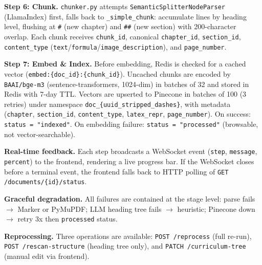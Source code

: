 \documentclass[12pt,a4paper]{article}
\begin{document}
\bigskip

\textbf{Step 6: Chunk.} \texttt{chunker.py} attempts \texttt{SemanticSplitterNodeParser} (LlamaIndex) first, falls back to \texttt{\_simple\_chunk}: accumulate lines by heading level, flushing at \texttt{\#} (new chapter) and \texttt{\#\#} (new section) with 200-character overlap. Each chunk receives \texttt{chunk\_id}, canonical \texttt{chapter\_id}, \texttt{section\_id}, \texttt{content\_type} (\texttt{text}/\texttt{formula}/\texttt{image\_description}), and \texttt{page\_number}.

\bigskip

\textbf{Step 7: Embed \& Index.} Before embedding, Redis is checked for a cached vector (\texttt{embed:\{doc\_id\}:\{chunk\_id\}}). Uncached chunks are encoded by \texttt{BAAI/bge-m3} (sentence-transformers, 1024-dim) in batches of 32 and stored in Redis with 7-day TTL. Vectors are upserted to Pinecone in batches of 100 (3 retries) under namespace \texttt{doc\_\{uuid\_stripped\_dashes\}}, with metadata (\texttt{chapter}, \texttt{section\_id}, \texttt{content\_type}, \texttt{latex\_repr}, \texttt{page\_number}). On success: \texttt{status = "indexed"}. On embedding failure: \texttt{status = "processed"} (browsable, not vector-searchable).

\bigskip

\textbf{Real-time feedback.} Each step broadcasts a WebSocket event (\texttt{step}, \texttt{message}, \texttt{percent}) to the frontend, rendering a live progress bar. If the WebSocket closes before a terminal event, the frontend falls back to HTTP polling of \texttt{GET /documents/\{id\}/status}.

\bigskip

\textbf{Graceful degradation.} All failures are contained at the stage level: parse fails $\rightarrow$ Marker or PyMuPDF; LLM heading tree fails $\rightarrow$ heuristic; Pinecone down $\rightarrow$ retry 3x then \texttt{processed} status.

\bigskip

\textbf{Reprocessing.} Three operations are available: \texttt{POST /reprocess} (full re-run), \texttt{POST /rescan-structure} (heading tree only), and \texttt{PATCH /curriculum-tree} (manual edit via frontend).
\end{document}
